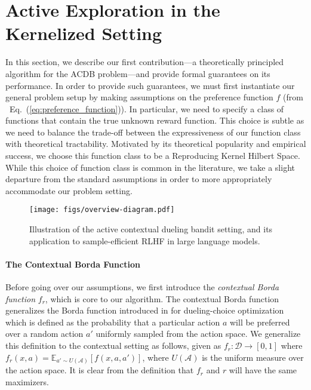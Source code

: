 \documentclass{article} \usepackage{iclr2023_conference,times}
\def\eqref#1{Eq.~(\ref{#1})}
\newcommand{\Ebb}{\mathbb{E}}
\newcommand{\Actionspace}{\mathcal{A}}
\newcommand{\borda}{f_r}
\newcommand{\preferenceMatrix}{f}
\newcommand{\Domain}{\mathcal{D}}
\newcommand{\add}[1]{#1}
\begin{document}
 \vspace{-2mm}
\section{Active Exploration in the Kernelized Setting}
\label{s:kocbd}
\vspace{-1mm}

In this section, we describe our first contribution---a theoretically principled algorithm for the ACDB problem---and provide formal guarantees on its performance.
In order to provide such guarantees, we must first instantiate our general problem setup by making assumptions on the preference function $\preferenceMatrix$ (from ~\eqref{eq:preference_function}).
In particular, we need to specify a class of functions that contain the true unknown reward function.
This choice is subtle as we need to balance the trade-off between the expressiveness of our function class with theoretical tractability.
Motivated by its theoretical popularity and empirical success, we choose this function class to be a Reproducing Kernel Hilbert Space.
While this choice of function class is common in the literature, we take a slight departure from the standard assumptions in order to more appropriately accommodate our problem setting.

\begin{figure}
    \centering
    \texttt{[image: figs/overview-diagram.pdf]}
    \vspace{-2mm}
    \caption{\small Illustration of the \add{active} contextual dueling bandit setting, and its application to sample-efficient RLHF in large language models.}
    \label{fig:overview_diagram}
    \vspace{-3mm}
\end{figure}

\paragraph{The Contextual Borda Function} Before going over our assumptions, we first introduce the \emph{contextual Borda function} $\borda$, which is core to our algorithm.
The contextual Borda function generalizes the Borda function introduced in \citet{xu2020zeroth} for dueling-choice optimization which is defined as the probability that a particular action $a$ will be preferred over a random action $a'$ uniformly sampled from the action space.
We generalize this definition to the contextual setting as follows, given as $\borda: \Domain \to [0, 1]$ where $\borda(x, a) = \Ebb_{a'\sim U(\Actionspace)}\left[\preferenceMatrix(x, a, a')\right]$, where $U(\Actionspace)$ is the uniform measure over the action space.
It is clear from the definition that $f_r$ and $r$ will have the same maximizers.
\end{document}
